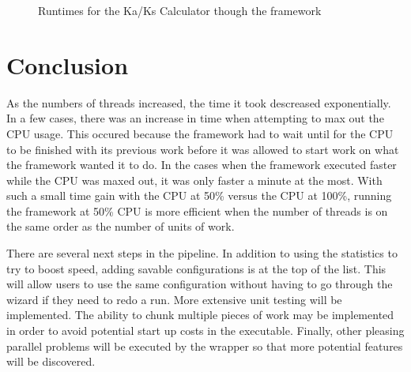 \documentclass[12pt]{article}
\begin{document}
\begin{figure}
{}
\caption{Runtimes for the Ka/Ks Calculator though the framework}
\label{fig:graph}
\end{figure}

\section{Conclusion}

As the numbers of threads increased, the time it took descreased exponentially. 
In a few cases, there was an increase in time when attempting to max out the CPU 
usage. This occured because the framework had to wait until for the CPU to be 
finished with its previous work before it was allowed to start work on what the 
framework wanted it to do. In the cases when the framework executed faster while
the CPU was maxed out, it was only faster a minute at the most. With such a
small time gain with the CPU at 50\% versus the CPU at 100\%, running the
framework at 50\% CPU is more efficient when the number of threads is on the
same order as the number of units of work.

There are several next steps in the pipeline. In addition to using the
statistics to try to boost speed, adding savable configurations is at the top of
the list. This will allow users to use the same configuration without having to
go through the wizard if they need to redo a run. More extensive unit testing
will be implemented. The ability to chunk multiple pieces of work may be
implemented in order to avoid potential start up costs in the executable. 
Finally, other pleasing parallel problems will be executed by the wrapper so 
that more potential features will be discovered. 
\end{document}
